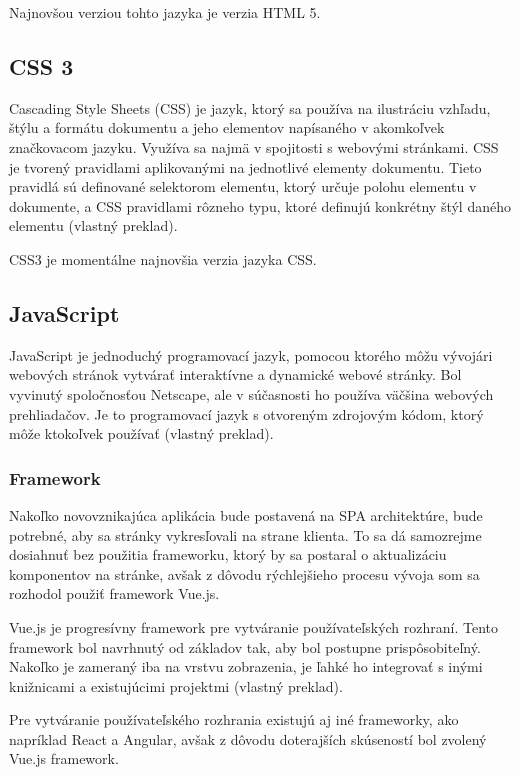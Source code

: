 Najnovšou verziou tohto jazyka je verzia HTML 5.

\subsection{CSS 3}
Cascading Style Sheets (CSS) je jazyk, ktorý sa používa na ilustráciu vzhľadu, štýlu a formátu dokumentu a jeho elementov napísaného v akomkoľvek značkovacom jazyku. Využíva sa najmä v spojitosti s webovými stránkami. CSS je tvorený pravidlami aplikovanými na jednotlivé elementy dokumentu. Tieto pravidlá sú definované selektorom elementu, ktorý určuje polohu elementu v dokumente, a CSS pravidlami rôzneho typu, ktoré definujú konkrétny štýl daného elementu \cite{co-je-css} (vlastný preklad). 

CSS3 je momentálne najnovšia verzia jazyka CSS.

\subsection{JavaScript}
JavaScript je jednoduchý programovací jazyk, pomocou ktorého môžu vývojári webových stránok vytvárať interaktívne a dynamické webové stránky. Bol vyvinutý spoločnosťou Netscape, ale v súčasnosti ho používa väčšina webových prehliadačov. Je to programovací jazyk s otvoreným zdrojovým kódom, ktorý môže ktokoľvek používať \cite{co-je-js} (vlastný preklad).

\subsubsection*{Framework}
Nakoľko novovznikajúca aplikácia bude postavená na SPA architektúre, bude potrebné, aby sa stránky vykresľovali na strane klienta. To sa dá samozrejme dosiahnuť bez použitia frameworku, ktorý by sa postaral o aktualizáciu komponentov na stránke, avšak z dôvodu rýchlejšieho procesu vývoja som sa rozhodol použiť framework Vue.js.

Vue.js je progresívny framework pre vytváranie používateľských rozhraní. Tento framework bol navrhnutý od základov tak, aby bol postupne prispôsobiteľný. Nakoľko je zameraný iba na vrstvu zobrazenia, je ľahké ho integrovať s inými knižnicami a existujúcimi projektmi \cite{co-je-vue} (vlastný preklad).

Pre vytváranie používateľského rozhrania existujú aj iné frameworky, ako napríklad React a Angular, avšak z dôvodu doterajších skúseností bol zvolený Vue.js framework.

\pagebreak

